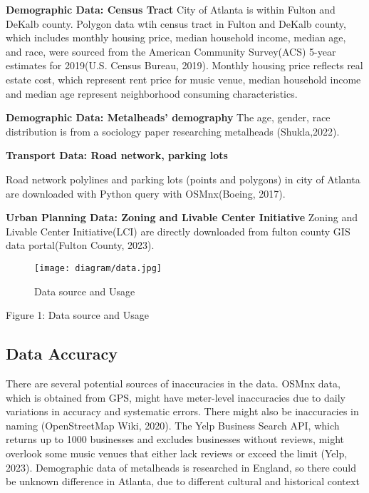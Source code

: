\documentclass[11pt]{article}
\begin{document}
\textbf{Demographic Data: Census Tract}
City of Atlanta is within Fulton and DeKalb county. Polygon data wtih census tract in Fulton and DeKalb county, which includes monthly housing price, median household income, median age, and race, were sourced from the American Community Survey(ACS) 5-year estimates for 2019(U.S. Census Bureau, 2019). Monthly housing price reflects real estate cost, which represent rent price for music venue, median household income and median age represent neighborhood consuming characteristics.

\textbf{Demographic Data: Metalheads' demography}
The age, gender, race distribution is from a sociology paper researching metalheads (Shukla,2022).

\textbf{Transport Data: Road network, parking lots} 

Road network polylines and parking lots (points and polygons) in city of Atlanta are downloaded with Python query with OSMnx(Boeing, 2017).

\textbf{Urban Planning Data: Zoning and Livable Center Initiative}
Zoning and Livable Center Initiative(LCI) are directly downloaded from fulton county GIS data portal(Fulton County, 2023).



\begin{figure}[h!]
\begin{center}
\centering
\texttt{[image: diagram/data.jpg]}
\caption{Data source and Usage}
\label{fig:figure1}
\end{center}
\end{figure}

\begin{center}
\centering
Figure 1: Data source and Usage
\end{center}


\subsection{Data Accuracy}

There are several potential sources of inaccuracies in the data. OSMnx data, which is obtained from GPS, might have meter-level inaccuracies due to daily variations in accuracy and systematic errors. There might also be inaccuracies in naming (OpenStreetMap Wiki, 2020). The Yelp Business Search API, which returns up to 1000 businesses and excludes businesses without reviews, might overlook some music venues that either lack reviews or exceed the limit (Yelp, 2023). Demographic data of metalheads is researched in England, so there could be unknown difference in Atlanta, due to different cultural and historical context
\end{document}
